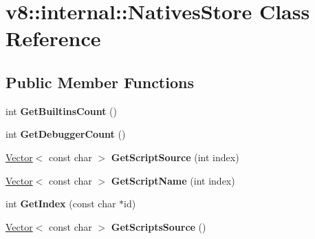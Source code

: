 \hypertarget{classv8_1_1internal_1_1_natives_store}{}\section{v8\+:\+:internal\+:\+:Natives\+Store Class Reference}
\label{classv8_1_1internal_1_1_natives_store}
\subsection*{Public Member Functions}
\begin{DoxyCompactItemize}
\item 
int {\bfseries Get\+Builtins\+Count} ()\hypertarget{classv8_1_1internal_1_1_natives_store_aa83dd7318798926fe7e06e933e9d10a3}{}\label{classv8_1_1internal_1_1_natives_store_aa83dd7318798926fe7e06e933e9d10a3}

\item 
int {\bfseries Get\+Debugger\+Count} ()\hypertarget{classv8_1_1internal_1_1_natives_store_ac287c2edbd1fe89ef5754426c159bbfa}{}\label{classv8_1_1internal_1_1_natives_store_ac287c2edbd1fe89ef5754426c159bbfa}

\item 
\hyperlink{classv8_1_1internal_1_1_vector}{Vector}$<$ const char $>$ {\bfseries Get\+Script\+Source} (int index)\hypertarget{classv8_1_1internal_1_1_natives_store_a091b840bae3d0c80b95d05d3db7acd82}{}\label{classv8_1_1internal_1_1_natives_store_a091b840bae3d0c80b95d05d3db7acd82}

\item 
\hyperlink{classv8_1_1internal_1_1_vector}{Vector}$<$ const char $>$ {\bfseries Get\+Script\+Name} (int index)\hypertarget{classv8_1_1internal_1_1_natives_store_a1bf5870025d691e06e95e87b0df35277}{}\label{classv8_1_1internal_1_1_natives_store_a1bf5870025d691e06e95e87b0df35277}

\item 
int {\bfseries Get\+Index} (const char $\ast$id)\hypertarget{classv8_1_1internal_1_1_natives_store_a8c17f3c2d1ff5028c4387cf91c4cad75}{}\label{classv8_1_1internal_1_1_natives_store_a8c17f3c2d1ff5028c4387cf91c4cad75}

\item 
\hyperlink{classv8_1_1internal_1_1_vector}{Vector}$<$ const char $>$ {\bfseries Get\+Scripts\+Source} ()\hypertarget{classv8_1_1internal_1_1_natives_store_a2dd14f8739e2eed27dde73c7a792c4bb}{}\label{classv8_1_1internal_1_1_natives_store_a2dd14f8739e2eed27dde73c7a792c4bb}

\end{DoxyCompactItemize}
